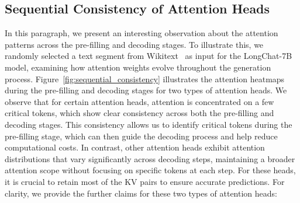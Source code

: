 \subsection{Sequential Consistency of Attention Heads}
\label{seq_consistency}

In this paragraph, we present an interesting observation about the attention patterns across the pre-filling and decoding stages. To illustrate this, we randomly selected a text segment from Wikitext~\cite{wikitext} as input for the LongChat-7B~\cite{longchat} model, examining how attention weights evolve throughout the generation process.
Figure~\ref{fig:sequential_consistency} illustrates the attention heatmaps during the pre-filling and decoding stages for two types of attention heads. We observe that for certain attention heads, attention is concentrated on a few critical tokens, which show clear consistency across both the pre-filling and decoding stages. This consistency allows us to identify critical tokens during the pre-filling stage, which can then guide the decoding process and help reduce computational costs. In contrast, other attention heads exhibit attention distributions that vary significantly across decoding steps, maintaining a broader attention scope without focusing on specific tokens at each step. For these heads, it is crucial to retain most of the KV pairs to ensure accurate predictions. For clarity, we provide the further claims for these two types of attention heads:


